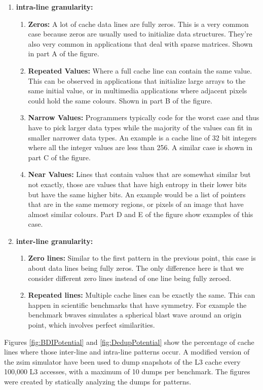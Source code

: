 \begin{enumerate}
    \item \textbf{intra-line granularity:}
    \begin{enumerate}
        \item \textbf{Zeros:} A lot of cache data lines are fully zeros\cite{balakrishnan2003exploiting, ekman2005robust, yang2000frequent}. This is a very common case because zeros are usually used to initialize data structures. They're also very common in applications that deal with sparse matrices. Shown in part A of the figure.
        \item \textbf{Repeated Values:} Where a full cache line can contain the same value\cite{sazeides1997predictability, alameldeen2004adaptive}. This can be observed in applications that initialize large arrays to the same initial value, or in multimedia applications where adjacent pixels could hold the same colours. Shown in part B of the figure.
        \item \textbf{Narrow Values:} Programmers typically code for the worst case and thus have to pick larger data types while the majority of the values can fit in smaller narrower data types\cite{alameldeen2004adaptive, islam2010characterization, wilson1999case}. An example is a cache line of 32 bit integers where all the integer values are less than 256. A similar case is shown in part C of the figure.
        \item \textbf{Near Values:} Lines that contain values that are somewhat similar but not exactly, those are values that have high entropy in their lower bits but have the same higher bits. An example would be a list of pointers that are in the same memory regions, or pixels of an image that have almost similar colours\cite{wilson1999case, sun2008dhtc}. Part D and E of the figure show examples of this case.
    \end{enumerate}
    \item \textbf{inter-line granularity:}
    \begin{enumerate}
        \item \textbf{Zero lines:} Similar to the first pattern in the previous point, this case is about data lines being fully zeros. The only difference here is that we consider different zero lines instead of one line being fully zeroed.
        \item \textbf{Repeated lines:} Multiple cache lines can be exactly the same. This can happen in scientific benchmarks that have symmetry\cite{dedup}. For example the benchmark bwaves\cite{spec} simulates a spherical blast wave around an origin point, which involves perfect similarities.
    \end{enumerate}
\end{enumerate}
Figures \ref{fig:BDIPotential} and \ref{fig:DedupPotential} show the percentage of cache lines where those inter-line and intra-line patterns occur. A modified version of the zsim\cite{zsim} simulator have been used to dump snapshots of the L3 cache every 100,000 L3 accesses, with a maximum of 10 dumps per benchmark. The figures were created by statically analyzing the dumps for patterns.


